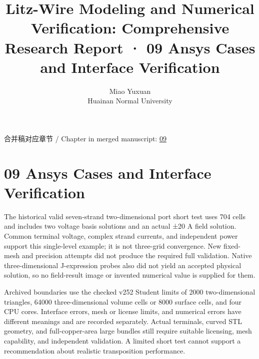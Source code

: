 \documentclass[11pt]{article}
\begin{document}
\title{Litz-Wire Modeling and Numerical Verification: Comprehensive Research Report · 09 Ansys Cases and Interface Verification}
\author{Miao Yuxuan\\Huainan Normal University}
\date{}
\maketitle
\noindent 合并稿对应章节 / Chapter in merged manuscript: \href{report_en_single.pdf#chapter-09}{09}\par
\FloatBarrier
\section*{09 Ansys Cases and Interface Verification}
\hypertarget{chapter-09}{}
The historical valid seven-strand two-dimensional port short test uses 704 cells and includes two voltage basis solutions and an actual ±20 A field solution. Common terminal voltage, complex strand currents, and independent power support this single-level example; it is not three-grid convergence. New fixed-mesh and precision attempts did not produce the required full validation. Native three-dimensional J-expression probes also did not yield an accepted physical solution, so no field-result image or invented numerical value is supplied for them.


Archived boundaries use the checked v252 Student limits of 2000 two-dimensional triangles, 64000 three-dimensional volume cells or 8000 surface cells, and four CPU cores. Interface errors, mesh or license limits, and numerical errors have different meanings and are recorded separately. Actual terminals, curved STL geometry, and full-copper-area large bundles still require suitable licensing, mesh capability, and independent validation. A limited short test cannot support a recommendation about realistic transposition performance.
\end{document}
